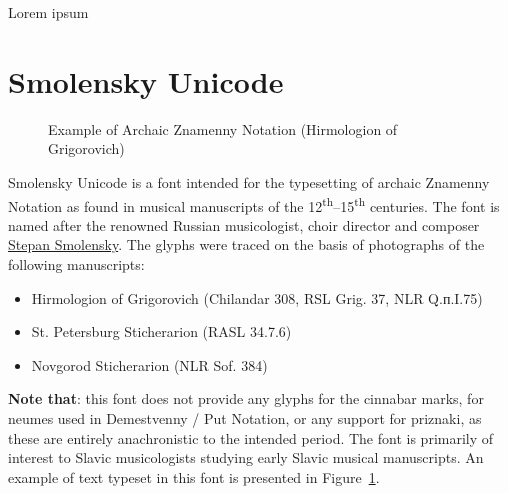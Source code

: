 \documentclass[11pt]{article}
\let\cuKrukFont=\musicFont
\begin{document}
Lorem ipsum

\section{Smolensky Unicode}

\begin{figure}[t]
\begin{churchslavonic}
\archaic
\noindent
\let\cuKrukFont=\smol
{}
\end{churchslavonic}
\caption{Example of Archaic Znamenny Notation (Hirmologion of Grigorovich) \label{smolensky}}
\end{figure}

Smolensky Unicode is a font intended for the typesetting of archaic Znamenny Notation
as found in musical manuscripts of the 12\textsuperscript{th}--15\textsuperscript{th}
centuries. The font is named after the renowned Russian musicologist,
choir director and composer
\href{https://en.wikipedia.org/wiki/Stepan_Smolensky}{Stepan Smolensky}.
The glyphs were traced on the basis of photographs of the following manuscripts:

\begin{itemize}
\item Hirmologion of Grigorovich (Chilandar 308, RSL Grig. 37, NLR Q.п.I.75)
\item St. Petersburg Sticherarion (RASL 34.7.6)
\item Novgorod Sticherarion (NLR Sof. 384)
\end{itemize}

\textbf{Note that}: this font does not provide any glyphs for the cinnabar marks,
for neumes used in Demestvenny / Put Notation, or any support for priznaki, as these
are entirely anachronistic to the intended period. The font is primarily of
interest to Slavic musicologists studying early Slavic musical manuscripts.
An example of text typeset in this font is presented in Figure~\ref{smolensky}.
\end{document}
